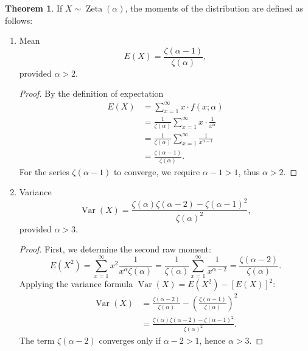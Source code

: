 \documentclass[12pt,a4paper]{report}
\theoremstyle{definition}
\newtheorem{thm}{Theorem}[section]
\theoremstyle{plain}
\theoremstyle{definition}
\begin{document}
\begin{thm}If $X \sim \operatorname{Zeta}(\alpha)$, the moments of the distribution are defined as follows:
\begin{enumerate}
\item Mean \[E(X) = \frac{\zeta(\alpha - 1)}{\zeta(\alpha)},\] provided $\alpha > 2$.
\begin{proof}By the definition of expectation
\begin{align*}
E(X) &= \sum_{x=1}^{\infty} x \cdot f(x; \alpha)\\
& = \frac{1}{\zeta(\alpha)} \sum_{x=1}^{\infty} x \cdot \frac{1}{x^{\alpha}}\\ 
&= \frac{1}{\zeta(\alpha)} \sum_{x=1}^{\infty} \frac{1}{x^{\alpha - 1}}\\
& = \frac{\zeta(\alpha - 1)}{\zeta(\alpha)}.
\end{align*}For the series $\zeta(\alpha - 1)$ to converge, we require $\alpha - 1 > 1$, thus $\alpha > 2$.
\end{proof}
\item Variance \[\operatorname{Var}(X) = \frac{\zeta(\alpha)\zeta(\alpha-2) - \zeta(\alpha-1)^2}{\zeta(\alpha)^2},\] provided $\alpha > 3$.
\begin{proof}
First, we determine the second raw moment:
\[ E(X^2) = \sum_{x=1}^{\infty} x^2 \frac{1}{x^{\alpha} \zeta(\alpha)} = \frac{1}{\zeta(\alpha)} \sum_{x=1}^{\infty} \frac{1}{x^{\alpha - 2}} = \frac{\zeta(\alpha - 2)}{\zeta(\alpha)}. \]
Applying the variance formula $\operatorname{Var}(X) = E(X^2) - [E(X)]^2$:
\begin{align*}
\operatorname{Var}(X) &= \frac{\zeta(\alpha - 2)}{\zeta(\alpha)} - \left( \frac{\zeta(\alpha - 1)}{\zeta(\alpha)} \right)^2 \\
&= \frac{\zeta(\alpha)\zeta(\alpha - 2) - \zeta(\alpha - 1)^2}{\zeta(\alpha)^2}.
\end{align*}
The term $\zeta(\alpha - 2)$ converges only if $\alpha - 2 > 1$, hence $\alpha > 3$.
\end{proof}
\end{enumerate}
\end{thm}
\end{document}
